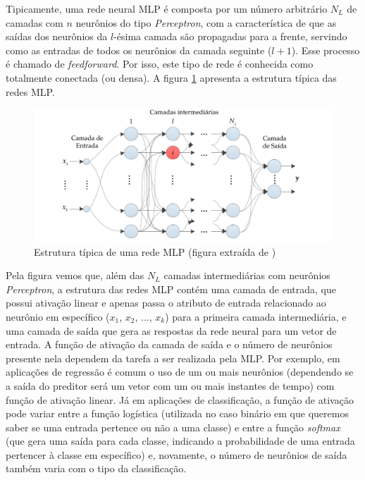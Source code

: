 \documentclass[a4paper, 12pt]{article}
\begin{document}
Tipicamente, uma rede neural MLP é composta por um número arbitrário $N_L$ de  camadas com $n$ neurônios do tipo \textit{Perceptron}, com a característica de que as saídas dos neurônios da $l$-ésima camada são propagadas para a frente, servindo como as entradas de todos os neurônios da camada seguinte ($l+1$). Esse processo é chamado de \textit{feedforward}. Por isso, este tipo de rede é conhecida como totalmente conectada (ou densa). A figura \ref{fig:mlp-architecture} apresenta a estrutura típica das redes MLP.

\begin{figure}[!ht]
\centering
\includegraphics[scale = 0.8]{mlp-network.pdf}
\caption{Estrutura típica de uma rede MLP (figura extraída de \cite{boccato2013novas}) }
\label{fig:mlp-architecture}
\end{figure}

Pela figura vemos que, além das $N_L$ camadas intermediárias com neurônios \textit{Perceptron}, a estrutura das redes MLP contém uma camada de entrada, que possui ativação linear e apenas passa o atributo de entrada relacionado ao neurônio em específico ($x_1$, $x_2$, ..., $x_k$) para a primeira camada intermediária, e uma camada de saída que gera as respostas da rede neural para um vetor de entrada. A função de ativação da camada de saída e o número de neurônios presente nela dependem da tarefa a ser realizada pela MLP. Por exemplo, em aplicações de regressão é comum o uso de um ou mais neurônios (dependendo se a saída do preditor será um vetor com um ou mais instantes de tempo) com função de ativação linear. Já em aplicações de classificação, a função de ativação pode variar entre a função logística (utilizada no caso binário em que queremos saber se uma entrada pertence ou não a uma classe) e entre a função \textit{softmax} (que gera uma saída para cada classe, indicando a probabilidade de uma entrada pertencer à classe em específico) e, novamente, o número de neurônios de saída também varia com o tipo da classificação.
\end{document}
